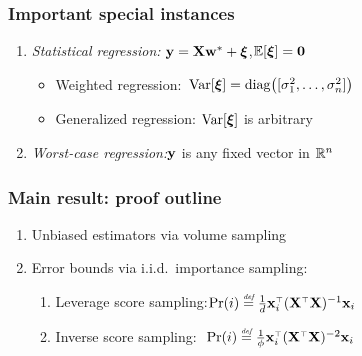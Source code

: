 \documentclass{beamer}
\begin{document}
\begin{frame}
  \frametitle{Important special instances}
  \begin{enumerate}
  \item    \textit{Statistical regression:}\quad
    $\mathbf y = \mathbf X\mathbf w^*+\boldsymbol\xi$,\quad $\mathbb E[\boldsymbol\xi]=\mathbf 0$
    \pause\vspace{2mm}
    \begin{itemize}
    \item Weighted regression:\quad\ 
      $\mathrm{Var}[\boldsymbol\xi]=\mathrm{diag}\big([\sigma_1^2,\dots,\sigma_n^2]\big)$\\[2mm]
      \pause
      \item Generalized regression: $\mathrm{Var}[\boldsymbol\xi]$ is
        arbitrary
        \end{itemize}
        \pause\vspace{5mm}
      \item \textit{Worst-case regression:}\quad $\mathbf y$ is any fixed vector in
        $\mathbb R^n$
  \end{enumerate}
\end{frame}

\begin{frame}
  \frametitle{Main result: proof outline}
  \pause
  \begin{enumerate}
  \item Unbiased estimators via volume sampling\\[4mm]\pause
  \item Error bounds via i.i.d.~importance sampling:\\[1mm]\pause
    \begin{enumerate}
    \item Leverage score sampling:\quad  $\Pr(i) \defeq \frac1d \x_i^\top(\X^\top\X)^{-1}\x_i$\\[1mm]\pause
    \item Inverse score sampling:\quad \ \,$\Pr(i)\defeq
     \frac1\phi\x_i^\top(\X^\top\X)^{-2}\x_i$\quad{}
    \end{enumerate}
  \end{enumerate}
\end{frame}
\end{document}

